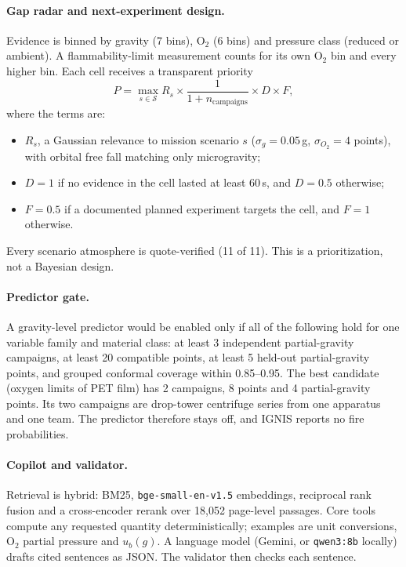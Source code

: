 \documentclass[10pt]{article}
\begin{document}
\paragraph{Gap radar and next-experiment design.}
Evidence is binned by gravity (7 bins), O$_2$ (6 bins) and pressure class (reduced or ambient). A flammability-limit
measurement counts for its own O$_2$ bin and every higher bin. Each cell receives a transparent priority
\begin{equation}
P = \max_{s\in\mathcal{S}} R_s \times \frac{1}{1+n_\mathrm{campaigns}} \times D \times F,
\end{equation}
where the terms are:
\begin{itemize}
\item $R_s$, a Gaussian relevance to mission scenario $s$ ($\sigma_g = 0.05$\,g, $\sigma_{O_2} = 4$ points), with
orbital free fall matching only microgravity;
\item $D = 1$ if no evidence in the cell lasted at least 60\,s, and $D = 0.5$ otherwise;
\item $F = 0.5$ if a documented planned experiment targets the cell, and $F = 1$ otherwise.
\end{itemize}
Every scenario atmosphere is quote-verified (11 of 11). This is a prioritization, not a Bayesian design.

\paragraph{Predictor gate.}
A gravity-level predictor would be enabled only if all of the following hold for one variable family and material
class: at least 3 independent partial-gravity campaigns, at least 20 compatible points, at least 5 held-out
partial-gravity points, and grouped conformal coverage within 0.85--0.95. The best candidate (oxygen limits of PET
film) has 2 campaigns, 8 points and 4 partial-gravity points. Its two campaigns are drop-tower centrifuge series
from one apparatus and one team. The predictor therefore stays off, and IGNIS reports no fire probabilities.

\paragraph{Copilot and validator.}
Retrieval is hybrid: BM25, \texttt{bge-small-en-v1.5} embeddings, reciprocal rank fusion and a cross-encoder rerank
over 18{,}052 page-level passages. Core tools compute any requested quantity deterministically; examples are unit
conversions, O$_2$ partial pressure and $u_b(g)$. A language model (Gemini, or \texttt{qwen3:8b} locally) drafts
cited sentences as JSON. The validator then checks each sentence.
\end{document}
